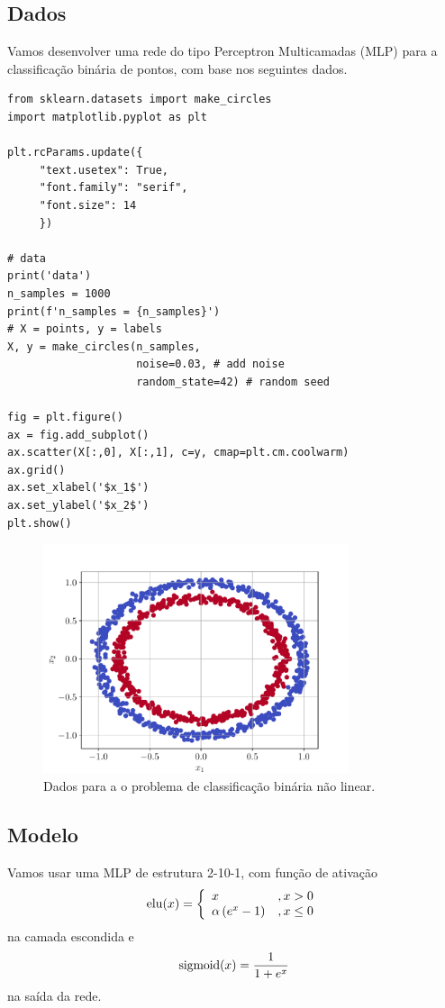 \subsection{Dados}

Vamos desenvolver uma rede do tipo Perceptron Multicamadas (MLP) para a classificação binária de pontos, com base nos seguintes dados.

\begin{lstlisting}
from sklearn.datasets import make_circles
import matplotlib.pyplot as plt

plt.rcParams.update({
     "text.usetex": True,
     "font.family": "serif",
     "font.size": 14
     })

# data
print('data')
n_samples = 1000
print(f'n_samples = {n_samples}')
# X = points, y = labels
X, y = make_circles(n_samples,
                    noise=0.03, # add noise
                    random_state=42) # random seed

fig = plt.figure()
ax = fig.add_subplot()
ax.scatter(X[:,0], X[:,1], c=y, cmap=plt.cm.coolwarm)
ax.grid()
ax.set_xlabel('$x_1$')
ax.set_ylabel('$x_2$')
plt.show()
\end{lstlisting}

\begin{figure}[H]
  \centering
  \includegraphics[width=0.8\textwidth]{./cap_mlp/dados/fig_classbin/fig}
  \caption{Dados para a o problema de classificação binária não linear.}
  \label{cap_mlp_sec_classbin:fig:dados}
\end{figure}

\subsection{Modelo}

Vamos usar uma MLP de estrutura 2-10-1, com função de ativação
\begin{equation}
  \operatorname{elu}(x) = \left\{
    \begin{array}{ll}
      x &, x > 0\\
      \alpha\left(e^x - 1\right) &, x \leq 0
    \end{array}
\right.
\end{equation}
na camada escondida e
\begin{equation}
  \operatorname{sigmoid}(x) = \frac{1}{1 + e^x}
\end{equation}
na saída da rede.

